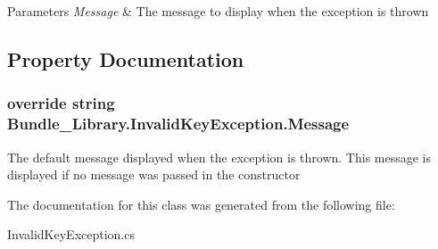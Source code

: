 \begin{DoxyParams}{Parameters}
{\em Message} & The message to display when the exception is thrown\\
\hline
\end{DoxyParams}


\subsection{Property Documentation}
\subsubsection[{Message}]{\setlength{\rightskip}{0pt plus 5cm}override string Bundle\+\_\+\+Library.\+Invalid\+Key\+Exception.\+Message\hspace{0.3cm}{\ttfamily [get]}}\label{class_bundle___library_1_1_invalid_key_exception_a909f1ead8e9f50400f74338e7d27c0fa}


The default message displayed when the exception is thrown. This message is displayed if no message was passed in the constructor 



The documentation for this class was generated from the following file\+:\begin{DoxyCompactItemize}
\item 
Invalid\+Key\+Exception.\+cs\end{DoxyCompactItemize}
